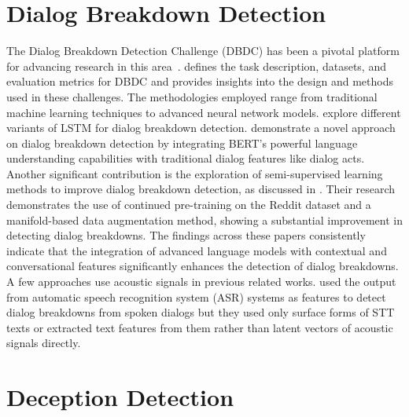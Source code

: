 \section{Dialog Breakdown Detection} The Dialog Breakdown Detection Challenge (DBDC) has been a pivotal platform for advancing research in this area~\cite{higashinaka-etal-2016-dialogue,HORI20191}. \cite{higashinaka-etal-2016-dialogue} defines the task description, datasets, and evaluation metrics for DBDC and provides insights into the design and methods used in these challenges. The methodologies employed range from traditional machine learning techniques to advanced neural network models. \cite{Hendriksen2021} explore different variants of LSTM for dialog breakdown detection. \cite{sugiyama2021dialogue} demonstrate a novel approach on dialog breakdown detection by integrating BERT's powerful language understanding capabilities with traditional dialog features like dialog acts. Another significant contribution is the exploration of semi-supervised learning methods to improve dialog breakdown detection, as discussed in \cite{Ng2020ImprovingDB}. Their research demonstrates the use of continued pre-training on the Reddit dataset and a manifold-based data augmentation method, showing a substantial improvement in detecting dialog breakdowns. The findings across these papers consistently indicate that the integration of advanced language models with contextual and conversational features significantly enhances the detection of dialog breakdowns. A few approaches use acoustic signals in previous related works. \cite{meena-etal-2015-automatic} used the output from automatic speech recognition system (ASR) systems as features to detect dialog breakdowns from spoken dialogs but they used only surface forms of STT texts or extracted text features from them rather than latent vectors of acoustic signals directly. 

\section{Deception Detection}

